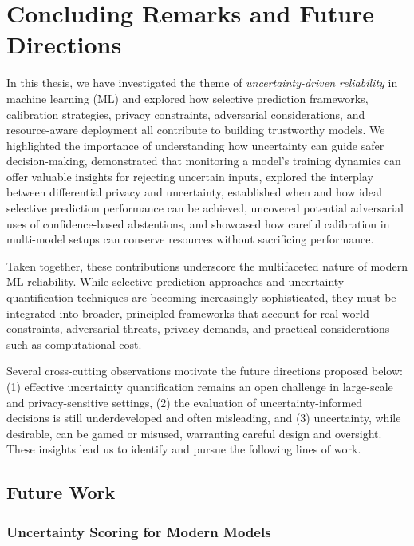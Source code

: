 \chapter{Concluding Remarks and Future Directions}
\label{ch:conclusion}

In this thesis, we have investigated the theme of \emph{uncertainty-driven reliability} in machine learning (ML) and explored how selective prediction frameworks, calibration strategies, privacy constraints, adversarial considerations, and resource-aware deployment all contribute to building trustworthy models. We highlighted the importance of understanding how uncertainty can guide safer decision-making, demonstrated that monitoring a model’s training dynamics can offer valuable insights for rejecting uncertain inputs, explored the interplay between differential privacy and uncertainty, established when and how ideal selective prediction performance can be achieved, uncovered potential adversarial uses of confidence-based abstentions, and showcased how careful calibration in multi-model setups can conserve resources without sacrificing performance.

Taken together, these contributions underscore the multifaceted nature of modern ML reliability. While selective prediction approaches and uncertainty quantification techniques are becoming increasingly sophisticated, they must be integrated into broader, principled frameworks that account for real-world constraints, adversarial threats, privacy demands, and practical considerations such as computational cost. 

Several cross-cutting observations motivate the future directions proposed below: (1) effective uncertainty quantification remains an open challenge in large-scale and privacy-sensitive settings, (2) the evaluation of uncertainty-informed decisions is still underdeveloped and often misleading, and (3) uncertainty, while desirable, can be gamed or misused, warranting careful design and oversight. These insights lead us to identify and pursue the following lines of work.

\section{Future Work}

\subsection{Uncertainty Scoring for Modern Models}

